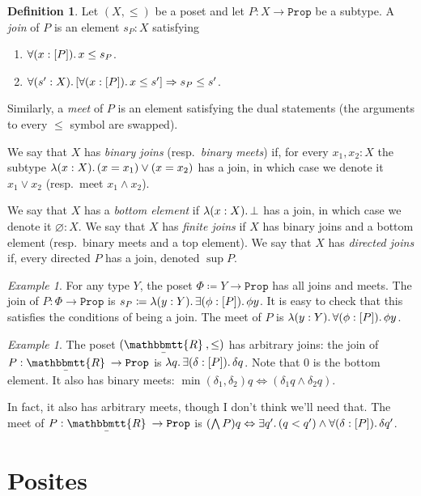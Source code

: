 \documentclass[11pt, oneside, article]{memoir}
\theoremstyle{plain}
\theoremstyle{definition}
\newtheorem{definition}[theorem]{Definition}
\theoremstyle{remark}
\newtheorem{example}[theorem]{Example}
\DeclarePairedDelimiter{\subtype}{[}{]}
\newcommand{\const}[1]{\mathtt{#1}}
\newcommand{\ubar}[1]{\underaccent{\bar}{#1}}
\newcommand{\internal}[1]{\raisebox{-.03ex}{$\mathbbmtt{#1}$}}
\newcommand{\hs}{\hspace{1.1pt}}
\newcommand{\tRR}{\internal{R}\hs}
\newcommand{\tLR}{\ubar{\tRR}\hs}
\newcommand{\Prop}{\const{Prop}}
\newcommand{\imp}{\Rightarrow}
\renewcommand{\iff}{\Leftrightarrow}
\begin{document}
\begin{definition}
Let $(X,\leq)$ be a poset and let $P:X\to\Prop$ be a subtype. A \emph{join} of $P$ is an element $s_P:X$ satisfying
\begin{enumerate}
	\item $\forall(x:\subtype{P})\ldotp x\leq s_P$.
	\item $\forall(s':X)\ldotp[\forall(x:\subtype{P})\ldotp x\leq s']\imp s_P\leq s'$.
\end{enumerate}
Similarly, a \emph{meet} of $P$ is an element satisfying the dual statements (the arguments to every $\leq$ symbol are swapped).

We say that $X$ has \emph{binary joins} (resp.\ \emph{binary meets}) if, for every $x_1,x_2:X$ the subtype $\lambda(x:X)\ldotp (x=x_1) \vee (x=x_2)$ has a join, in which case we denote it $x_1\vee x_2$ (resp.\ meet $x_1\wedge x_2$). 

We say that $X$ has a \emph{bottom element} if $\lambda(x:X)\ldotp \bot$ has a join, in which case we denote it $\varnothing:X$. We say that $X$ has \emph{finite joins} if $X$ has binary joins and a bottom element (resp.\ binary meets and a top element). We say that $X$ has \emph{directed joins} if, every directed $P$ has a join, denoted $\sup P$.
\end{definition}

\begin{example}
For any type $Y$, the poset $\Phi\coloneqq Y\to\Prop$ has all joins and meets. The join of $P:\Phi\to\Prop$ is $s_P\coloneqq\lambda(y:Y)\ldotp\exists(\phi:\subtype{P})\ldotp\phi y$. It is easy to check that this satisfies the conditions of being a join. The meet of $P$ is $\lambda(y:Y)\ldotp\forall(\phi:\subtype{P})\ldotp\phi y$.
\end{example}

\begin{example}
The poset $(\tLR,\leq)$ has arbitrary joins: the join of $P:\tLR\to\Prop$ is $\lambda q\ldotp\exists(\delta:\subtype{P})\ldotp\delta q$. Note that $0$ is the bottom element. It also has binary meets: $\min(\delta_1,\delta_2)q\iff(\delta_1 q\wedge \delta_2q)$.

In fact, it also has arbitrary meets, though I don't think we'll need that. The meet of $P:\tLR\to\Prop$ is $(\bigwedge P)q\iff\exists q'\ldotp (q<q')\wedge\forall(\delta:\subtype{P})\ldotp\delta q'$.
\end{example}
\section{Posites}
\end{document}
